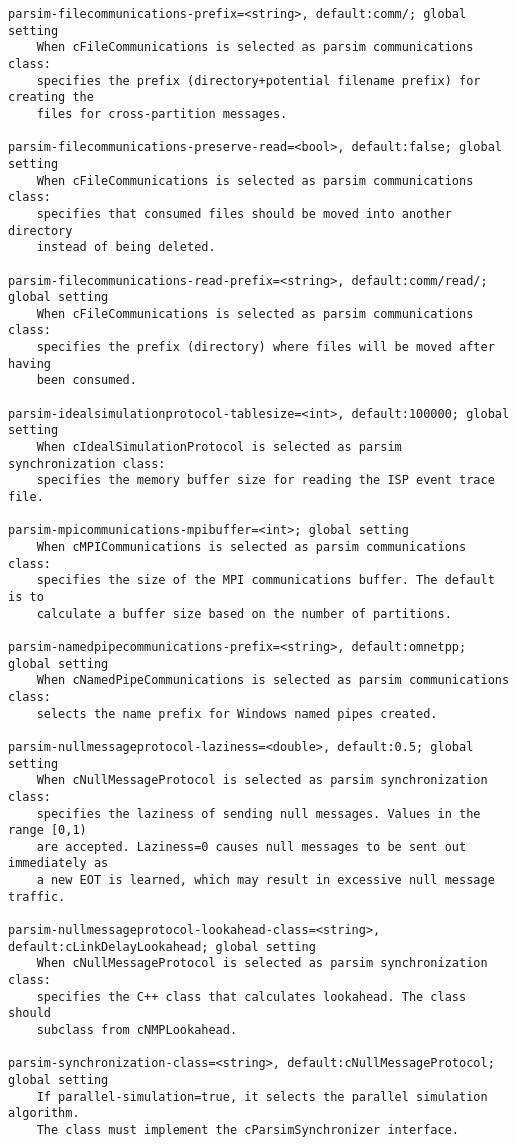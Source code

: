 \begin{verbatim}
parsim-filecommunications-prefix=<string>, default:comm/; global setting
    When cFileCommunications is selected as parsim communications class:
    specifies the prefix (directory+potential filename prefix) for creating the
    files for cross-partition messages.

parsim-filecommunications-preserve-read=<bool>, default:false; global setting
    When cFileCommunications is selected as parsim communications class:
    specifies that consumed files should be moved into another directory
    instead of being deleted.

parsim-filecommunications-read-prefix=<string>, default:comm/read/; global setting
    When cFileCommunications is selected as parsim communications class:
    specifies the prefix (directory) where files will be moved after having
    been consumed.

parsim-idealsimulationprotocol-tablesize=<int>, default:100000; global setting
    When cIdealSimulationProtocol is selected as parsim synchronization class:
    specifies the memory buffer size for reading the ISP event trace file.

parsim-mpicommunications-mpibuffer=<int>; global setting
    When cMPICommunications is selected as parsim communications class:
    specifies the size of the MPI communications buffer. The default is to
    calculate a buffer size based on the number of partitions.

parsim-namedpipecommunications-prefix=<string>, default:omnetpp; global setting
    When cNamedPipeCommunications is selected as parsim communications class:
    selects the name prefix for Windows named pipes created.

parsim-nullmessageprotocol-laziness=<double>, default:0.5; global setting
    When cNullMessageProtocol is selected as parsim synchronization class:
    specifies the laziness of sending null messages. Values in the range [0,1)
    are accepted. Laziness=0 causes null messages to be sent out immediately as
    a new EOT is learned, which may result in excessive null message traffic.

parsim-nullmessageprotocol-lookahead-class=<string>, default:cLinkDelayLookahead; global setting
    When cNullMessageProtocol is selected as parsim synchronization class:
    specifies the C++ class that calculates lookahead. The class should
    subclass from cNMPLookahead.

parsim-synchronization-class=<string>, default:cNullMessageProtocol; global setting
    If parallel-simulation=true, it selects the parallel simulation algorithm.
    The class must implement the cParsimSynchronizer interface.


\end{verbatim}
